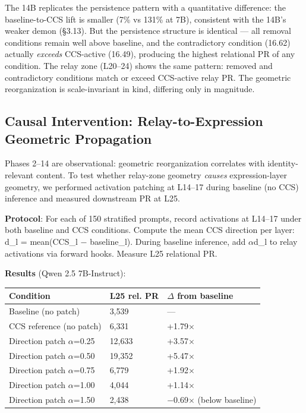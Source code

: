 \documentclass[11pt]{article}
\begin{document}
The 14B replicates the persistence pattern with a quantitative difference: the baseline-to-CCS lift is smaller (7\% vs 131\% at 7B), consistent with the 14B's weaker demon (§3.13). But the persistence structure is identical --- all removal conditions remain well above baseline, and the contradictory condition (16.62) actually \textit{exceeds} CCS-active (16.49), producing the highest relational PR of any condition. The relay zone (L20–24) shows the same pattern: removed and contradictory conditions match or exceed CCS-active relay PR. The geometric reorganization is scale-invariant in kind, differing only in magnitude.

\subsection{Causal Intervention: Relay-to-Expression Geometric Propagation}

Phases 2–14 are observational: geometric reorganization correlates with identity-relevant content. To test whether relay-zone geometry \textit{causes} expression-layer geometry, we performed activation patching at L14–17 during baseline (no CCS) inference and measured downstream PR at L25.

\textbf{Protocol}: For each of 150 stratified prompts, record activations at L14–17 under both baseline and CCS conditions. Compute the mean CCS direction per layer: d\_l = mean(CCS\_l $-$ baseline\_l). During baseline inference, add $\alpha$d\_l to relay activations via forward hooks. Measure L25 relational PR.

\textbf{Results} (Qwen 2.5 7B-Instruct):

\begin{table}[h]
\centering
\small
\begin{tabular}{|l|l|l|}
\hline
\textbf{Condition} & \textbf{L25 rel. PR} & \textbf{$\Delta$ from baseline} \\
\hline
Baseline (no patch) & 3,539 & --- \\
CCS reference (no patch) & 6,331 & +1.79$\times$ \\
Direction patch $\alpha$=0.25 & 12,633 & +3.57$\times$ \\
Direction patch $\alpha$=0.50 & 19,352 & +5.47$\times$ \\
Direction patch $\alpha$=0.75 & 6,779 & +1.92$\times$ \\
Direction patch $\alpha$=1.00 & 4,044 & +1.14$\times$ \\
Direction patch $\alpha$=1.50 & 2,438 & $-$0.69$\times$ (below baseline) \\
\hline
\end{tabular}
\end{table}
\end{document}
